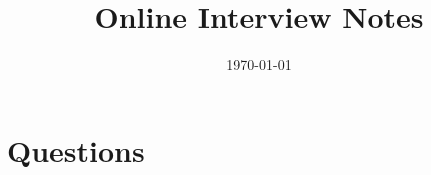



\title{Online Interview Notes}

\author{\myName{}}
\date{\today}
\makeatletter
\fancyfoot[L]{\scshape \MakeLowercase{\@author}}
\fancyfoot[R]{{\scshape \MakeLowercase{\@title}}\quad{\LARGE\sfrac{\thepage}{\pageref*{LastPage}}}}
\makeatother



\maketitle%
\thispagestyle{fancy}

\tableofcontents

\section{Questions}


